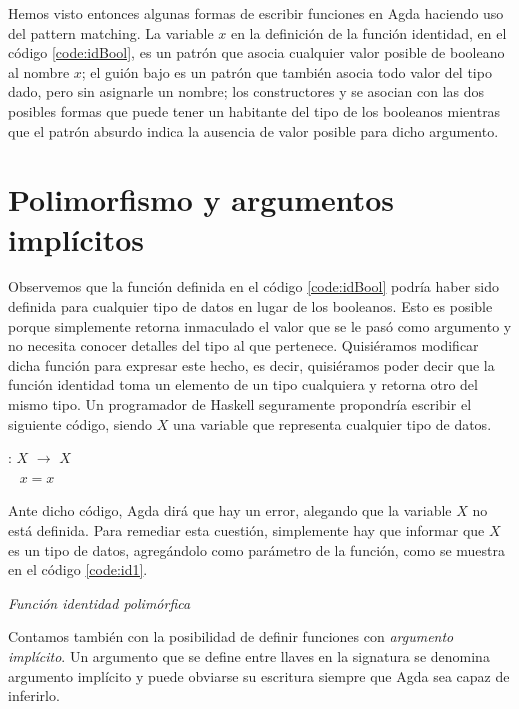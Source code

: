 Hemos visto entonces algunas formas de escribir funciones en Agda haciendo uso del pattern matching. La variable $x$ en la definición de la función identidad, en el código \ref{code:idBool}, es un patrón que asocia cualquier valor posible de booleano al nombre $x$; el guión bajo es un patrón que también asocia todo valor del tipo dado, pero sin asignarle un nombre; los constructores  y  se asocian con las dos posibles formas que puede tener un habitante del tipo de los booleanos mientras que el patrón absurdo indica la ausencia de valor posible para dicho argumento.

\section{Polimorfismo y argumentos implícitos}

Observemos que la función  definida en el código \ref{code:idBool} podría haber sido definida para cualquier tipo de datos en lugar de los booleanos. Esto es posible porque simplemente retorna inmaculado el valor que se le pasó como argumento y no necesita conocer detalles del tipo al que pertenece. Quisiéramos modificar dicha función para expresar este hecho, es decir, quisiéramos poder decir que la función identidad toma un elemento de un tipo cualquiera y retorna otro del mismo tipo.
Un programador de Haskell seguramente propondría escribir el siguiente código, siendo $X$ una variable que representa cualquier tipo de datos.

\sangrar
{} : $X$ $\to$ $X$\\
\-\ \hspace{4.5ex}
 $x = x$

Ante dicho código, Agda dirá que hay un error, alegando que la variable $X$ no está definida. Para remediar esta cuestión, simplemente hay que informar que $X$ es un tipo de datos, agregándolo como parámetro de la función, como se muestra en el código \ref{code:id1}. 
\begin{agdacode}{\it Función identidad polimórfica}\label{code:id1}

\end{agdacode}

Contamos también con la posibilidad de definir funciones con {\it argumento implícito}. 
Un argumento que se define entre llaves en la signatura se denomina argumento implícito y puede obviarse su escritura siempre que Agda sea capaz de inferirlo.

